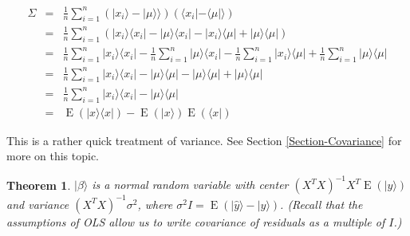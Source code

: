 \documentclass{amsbook}
\newtheorem{theorem}{Theorem}
\begin{document}
$$
\begin{array}{rcl}
\Sigma &=& \frac{1}{n}\sum_{i=1}^n\left(|x_i\rangle-|\mu\rangle\rangle\right)\left(\langle x_i|-\langle\mu|\rangle\right) \\
&=& \frac{1}{n}\sum_{i=1}^n\left(|x_i\rangle\langle x_i|-|\mu\rangle\langle x_i|-|x_i\rangle\langle\mu|+|\mu\rangle\langle\mu|\right) \\
&=& \frac{1}{n}\sum_{i=1}^n|x_i\rangle\langle x_i|-\frac{1}{n}\sum_{i=1}^n|\mu\rangle\langle x_i|-\frac{1}{n}\sum_{i=1}^n|x_i\rangle\langle\mu|+\frac{1}{n}\sum_{i=1}^n|\mu\rangle\langle\mu| \\
&=& \frac{1}{n}\sum_{i=1}^n|x_i\rangle\langle x_i|-|\mu\rangle\langle \mu|-|\mu\rangle\langle \mu|+|\mu\rangle\langle \mu| \\
&=&\frac{1}{n}\sum_{i=1}^n|x_i\rangle\langle x_i|-|\mu\rangle\langle \mu| \\
&=& \operatorname{E}\left(|x\rangle\langle x|\right) - \operatorname{E}\left(|x\rangle\right)\operatorname{E}\left(\langle x|\right)
\end{array}
$$

This is a rather quick treatment of variance.  See Section \ref{Section-Covariance} for more on this topic.

\begin{theorem}\label{Thm-OLS-var}
$|\beta\rangle$ is a normal random variable with center $\left(X^TX\right)^{-1}X^T\operatorname{E}\left(|y\rangle\right)$ and variance $\left(X^TX\right)^{-1}\sigma^2$, where $\sigma^2I=\operatorname{E}\left(|\hat y\rangle-|y\rangle\right)$.  (Recall that the assumptions of OLS allow us to write covariance of residuals as a multiple of $I$.)
\end{theorem}
\end{document}
